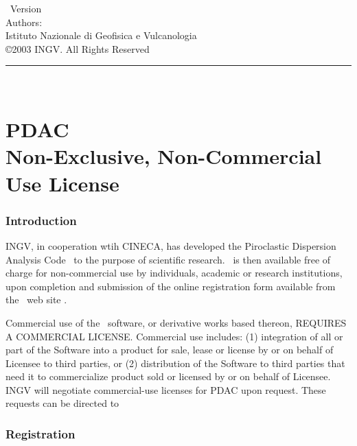 
\thispagestyle{empty}

\vspace*{0.1in}

\begin{centering}
{\LARGE \PDAC\ Version \PDACVERSION}\\
\bigskip
{\large Authors: \PDACAUTHORS} \\
\medskip
{\large Istituto Nazionale di Geofisica e Vulcanologia } \\
\bigskip
{\large \copyright 2003 INGV.
All Rights Reserved} \\
\bigskip
\end{centering}

  \rule{6in}{0.04in}				\\	\vspace{0.25in}

\section*{PDAC \PDACNAME \\
Non-Exclusive, Non-Commercial Use License}

\subsubsection*{Introduction}

INGV, in cooperation wtih CINECA,
has developed the Piroclastic Dispersion Analysis Code \PDAC\
to the purpose of scientific research.
\PDAC\ is then available free of charge for
non-commercial use by individuals, academic or research institutions,
upon completion and submission of the online registration form available 
from the \PDAC\ web site \PDACURL.

Commercial use of the \PDAC\ software, or derivative works based thereon,
REQUIRES A COMMERCIAL LICENSE. Commercial use includes: 
(1) integration of all or part of the Software into a product for sale, 
lease or license by or on behalf of Licensee to third parties, or 
(2) distribution of the Software to third parties that need it to 
commercialize product sold or licensed by or on behalf of Licensee.  
INGV will negotiate commercial-use licenses for PDAC upon request. 
These requests can be directed to \PDACADDRESS

\subsubsection*{Registration}

